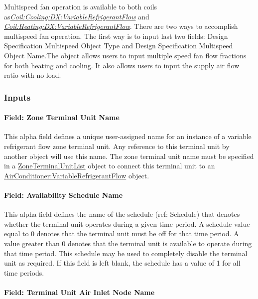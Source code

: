 Multispeed fan operation is available to both coils as\textit{\hyperref[coilcoolingdxvariablerefrigerantflow]{Coil:Cooling:DX:VariableRefrigerantFlow}} and \textit{\hyperref[coilheatingdxvariablerefrigerantflow]{Coil:Heating:DX:VariableRefrigerantFlow}}. There are two ways to accomplish multispeed fan operation. The first way is to input last two fields: Design Specification Multispeed Object Type and Design Specification Multispeed Object Name.The object allows users to input multiple speed fan flow fractions for both heating and cooling. It also allows users to input the supply air flow ratio with no load.

\subsubsection{Inputs}\label{inputs-14-018}

\paragraph{Field: Zone Terminal Unit Name}\label{field-zone-terminal-unit-name}

This alpha field defines a unique user-assigned name for an instance of a variable refrigerant flow zone terminal unit. Any reference to this terminal unit by another object will use this name. The zone terminal unit name must be specified in a \hyperref[zoneterminalunitlist]{ZoneTerminalUnitList} object to connect this terminal unit to an \hyperref[airconditionervariablerefrigerantflow]{AirConditioner:VariableRefrigerantFlow} object.

\paragraph{Field: Availability Schedule Name}\label{field-availability-schedule-name-13-001}

This alpha field defines the name of the schedule (ref: Schedule) that denotes whether the terminal unit operates during a given time period. A schedule value equal to 0 denotes that the terminal unit must be off for that time period. A value greater than 0 denotes that the terminal unit is available to operate during that time period. This schedule may be used to completely disable the terminal unit as required. If this field is left blank, the schedule has a value of 1 for all time periods.

\paragraph{Field: Terminal Unit Air Inlet Node Name}\label{field-terminal-unit-air-inlet-node-name}

